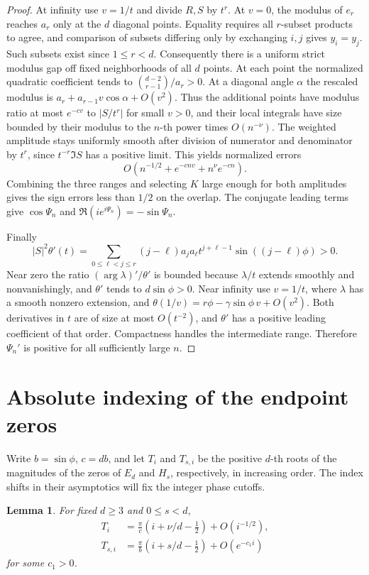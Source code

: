 \documentclass[11pt]{article}
\newtheorem{lemma}{Lemma}
\DeclareMathOperator{\Arg}{arg}
\begin{document}
\begin{proof}
At infinity use \(v=1/t\) and divide \(R,S\) by \(t^r\).
At \(v=0\), the modulus of \(e_r\) reaches \(a_r\) only
at the \(d\) diagonal points. Equality requires all
\(r\)-subset products to agree, and comparison of subsets
differing only by exchanging \(i,j\) gives \(y_i=y_j\).
Such subsets exist since \(1\le r<d\).
Consequently there is a uniform strict modulus gap off
fixed neighborhoods of all \(d\) points. At each point
the normalized quadratic coefficient tends to
\(\binom{d-2}{r-1}/a_r>0\). At a diagonal angle \(\alpha\)
the rescaled modulus is
\(a_r+a_{r-1}v\cos\alpha+O(v^2)\).
Thus the additional points have modulus ratio at most
\(e^{-cv}\) to \(|S/t^r|\) for small \(v>0\), and their
local integrals have size bounded by their modulus to
the \(n\)-th power times \(O(n^{-\nu})\).
The weighted amplitude stays uniformly smooth after
division of numerator and denominator by \(t^r\),
since \(t^{-r}\Im S\) has a positive limit.
This yields normalized errors
\[
O(n^{-1/2}+e^{-cnv}+n^\nu e^{-cn}).
\]
Combining the three ranges and selecting \(K\) large
enough for both amplitudes gives the sign errors
less than \(1/2\) on the overlap. The conjugate leading
terms give \(\cos\Psi_n\) and
\(\Re(i e^{i\Psi_n})=-\sin\Psi_n\).

Finally
\[
|S|^2\theta'(t)=
\sum_{0\le\ell<j\le r}(j-\ell)a_j a_\ell t^{j+\ell-1}
                \sin((j-\ell)\phi)>0.
\]
Near zero the ratio \((\Arg\lambda)'/\theta'\) is bounded
because \(\lambda/t\) extends smoothly and nonvanishingly,
and \(\theta'\) tends to \(d\sin\phi>0\).
Near infinity use \(v=1/t\), where \(\lambda\) has a
smooth nonzero extension, and
\(\theta(1/v)=r\phi-\gamma\sin\phi\,v+O(v^2)\).
Both derivatives in \(t\) are of size at most \(O(t^{-2})\),
and \(\theta'\) has a positive leading coefficient of that
order. Compactness handles the intermediate range.
Therefore \(\Psi_n'\) is positive for all sufficiently
large \(n\).
\end{proof}

\section{Absolute indexing of the endpoint zeros}

Write \(b=\sin\phi\), \(c=db\), and let \(T_i\) and \(T_{s,i}\)
be the positive \(d\)-th roots of the magnitudes of the zeros
of \(E_d\) and \(H_s\), respectively, in increasing order.
The index shifts in their asymptotics will fix the integer
phase cutoffs.

\begin{lemma}\label{lem:index}
For fixed \(d\ge3\) and \(0\le s<d\),
\begin{align}
T_i&=\frac{\pi}{c}(i+\nu/d-\tfrac12)+O(i^{-1/2}),
\label{eq:index-small}\\
T_{s,i}&=\frac{\pi}{b}(i+s/d-\tfrac12)+O(e^{-c_1i})
\label{eq:index-large}
\end{align}
for some \(c_1>0\).
\end{lemma}
\end{document}
